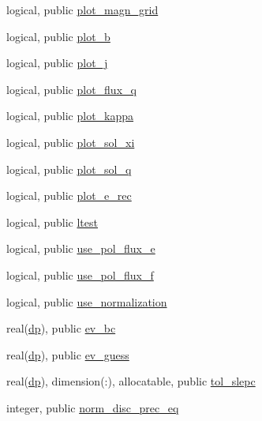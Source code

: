 \begin{DoxyCompactItemize}
\item 
logical, public \hyperlink{namespacenum__vars_ad6bbee854ff7479d1d2ded83cda04699}{plot\+\_\+magn\+\_\+grid}
\item 
logical, public \hyperlink{namespacenum__vars_a09ac710a02758a271706d96e50e5c1b1}{plot\+\_\+b}
\item 
logical, public \hyperlink{namespacenum__vars_aa5519c9217b33a3a677e058723638fa9}{plot\+\_\+j}
\item 
logical, public \hyperlink{namespacenum__vars_a3b821da571f91f9ec665538209b995a6}{plot\+\_\+flux\+\_\+q}
\item 
logical, public \hyperlink{namespacenum__vars_a15a00106d8f59e98ab924f905cf2ddac}{plot\+\_\+kappa}
\item 
logical, public \hyperlink{namespacenum__vars_aca13a9c68dbf136ed2a2a8e0fa04c087}{plot\+\_\+sol\+\_\+xi}
\item 
logical, public \hyperlink{namespacenum__vars_a478a829f8ec3af3e57e91bf48732a5e1}{plot\+\_\+sol\+\_\+q}
\item 
logical, public \hyperlink{namespacenum__vars_ae90f876bc701020d565d6e77c4dc8c61}{plot\+\_\+e\+\_\+rec}
\item 
logical, public \hyperlink{namespacenum__vars_a06597cae984d53aec80c150fc13d3e7f}{ltest}
\item 
logical, public \hyperlink{namespacenum__vars_adedd3c1e77cfdf75dac84e43ee54497a}{use\+\_\+pol\+\_\+flux\+\_\+e}
\item 
logical, public \hyperlink{namespacenum__vars_ae21ec57b791e369c3558c0eb3da1555b}{use\+\_\+pol\+\_\+flux\+\_\+f}
\item 
logical, public \hyperlink{namespacenum__vars_a585ed16ea01f299cd764690f057af2c6}{use\+\_\+normalization}
\item 
real(\hyperlink{namespacenum__vars_a03802aa2bd86439d7a9370836fabf3f2}{dp}), public \hyperlink{namespacenum__vars_a4efc3cca2482236a18b8927bca8361c2}{ev\+\_\+bc}
\item 
real(\hyperlink{namespacenum__vars_a03802aa2bd86439d7a9370836fabf3f2}{dp}), public \hyperlink{namespacenum__vars_a4c19f47e50c92bfd52985761500a999e}{ev\+\_\+guess}
\item 
real(\hyperlink{namespacenum__vars_a03802aa2bd86439d7a9370836fabf3f2}{dp}), dimension(\+:), allocatable, public \hyperlink{namespacenum__vars_acbfccf15a8af9fce37f9cb3f2c85be76}{tol\+\_\+slepc}
\item 
integer, public \hyperlink{namespacenum__vars_a9554337420be2ea367f2a6bc71bb654f}{norm\+\_\+disc\+\_\+prec\+\_\+eq}

\end{DoxyCompactItemize}
